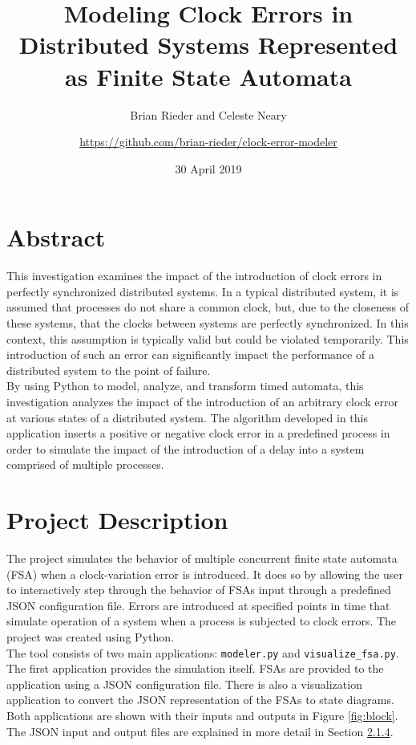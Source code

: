 \documentclass[12pt]{extarticle}
\title{Modeling Clock Errors in Distributed Systems Represented as Finite State Automata}
\author{Brian Rieder and Celeste Neary
\and \href{https://github.com/brian-rieder/clock-error-modeler}{https://github.com/brian-rieder/clock-error-modeler}}
\date{30 April 2019}
\begin{document}
\maketitle

\section{Abstract}

This investigation examines the impact of the introduction of clock errors in perfectly synchronized distributed systems. In a typical distributed system, it is assumed that processes do not share a common clock, but, due to the closeness of these systems, that the clocks between systems are perfectly synchronized. In this context, this assumption is typically valid but could be violated temporarily. This introduction of such an error can significantly impact the performance of a distributed system to the point of failure.\\

By using Python to model, analyze, and transform timed automata, this investigation analyzes the impact of the introduction of an arbitrary clock error at various states of a distributed system. The algorithm developed in this application inserts a positive or negative clock error in a predefined process in order to simulate the impact of the introduction of a delay into a system comprised of multiple processes. 

\section{Project Description}
The project simulates the behavior of multiple concurrent finite state automata (FSA) when a clock-variation error is introduced. It does so by allowing the user to interactively step through the behavior of FSAs input through a predefined JSON configuration file. Errors are introduced at specified points in time that simulate operation of a system when a process is subjected to clock errors. The project was created using Python.\\

The tool consists of two main applications: \verb|modeler.py| and \verb|visualize_fsa.py|. The first application provides the simulation itself. FSAs are provided to the application using a JSON configuration file. There is also a visualization application to convert the JSON representation of the FSAs to state diagrams. Both applications are shown with their inputs and outputs in Figure \ref{fig:block}. The JSON input and output files are explained in more detail in Section \hyperref[sec:config]{2.1.4}.
\end{document}
